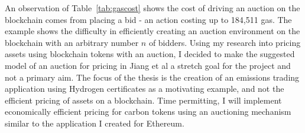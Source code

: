 An observation of Table~\ref{tab:gascost} shows the cost of
driving an auction on the blockchain comes from placing a bid
- an action costing up to 184,511 gas. The
example shows the difficulty in efficiently creating an auction
environment on the blockchain with an arbitrary number $n$ of bidders.
Using my research into pricing assets using blockchain tokens
with an auction, I decided to make the suggested model of an auction
for pricing
in Jiang et al a stretch goal for the project and not a primary aim.
The focus of the thesis is the creation of an emissions trading application
using Hydrogen certificates as a motivating example, and not the
efficient pricing of assets on a blockchain. Time permitting, I
will implement economically efficient pricing for carbon tokens
using an auctioning mechanism
similar to the application I created for Ethereum.